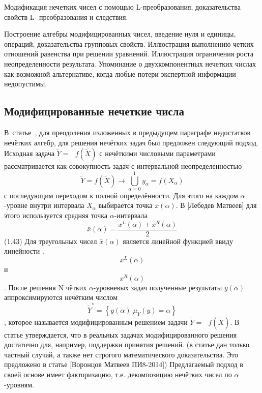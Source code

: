 Модификация нечетких чисел с помощью L-преобразования, доказательства свойств L- преобразования и следствия.

Построение алгебры модифицированных чисел, введение нуля и единицы,  операций, доказательства групповых свойств. Иллюстрация выполнению четких отношений равенства при решении уравнений. Иллюстрация ограничения роста неопределенности результата. Упоминание о двухкомпонентных нечетких числах как возможной альтернативе, когда любые потери экспертной информации недопустимы.

\subsection{Модифицированные нечеткие числа}

В~статье~\cite{Lebedev}, для преодоления изложенных в предыдущем параграфе недостатков нечётких алгебр, для решения нечётких задач был предложен следующий подход. Исходная задача $\tilde{Y}=\text{ }f\left( {\tilde{X}} \right)$ с нечёткими числовыми параметрами рассматривается как совокупность задач с интервальной неопределенностью
\begin{equation}
\label{eq:alpha-equivalence}
	\tilde{Y}=f\left( {\tilde{X}} \right)\to \bigcup\limits_{\alpha =0}^{1}{{{y}_{\alpha }}=f\left( {{X}_{\alpha }} \right)}
\end{equation}
с последующим переходом к полной определённости. Для этого на каждом $\alpha $-уровне внутри интервала $X_\alpha$ выбирается точка $\bar{x}\left( \alpha  \right)$. В [Лебедев Матвеев] для этого используется средняя точка $\alpha $-интервала
	\[\bar{x}\left( \alpha  \right)=\frac{{{x}^{L}}\left( \alpha  \right)+{{x}^{R}}\left( \alpha  \right)}{2}\] 	(1.43)
Для треугольных чисел $\bar{x}\left( \alpha  \right)$ является линейной функцией ввиду линейности .\[{{x}^{L}}\left( \alpha  \right)\] и \[{{x}^{R}}\left( \alpha  \right)\]. После решения N чётких $\alpha $-уровневых задач полученные результаты $y\left( \alpha  \right)$ аппроксимируются нечётким числом \[{{\tilde{Y}}^{*}}=\left\{ y(\alpha )\left| {{\mu }_{{\tilde{Y}}}}(y)=\alpha  \right. \right\}\], которое называется модифицированным решением задачи $\tilde{Y}=\text{ }f\left( {\tilde{X}} \right)$. В статье утверждается, что в реальных задачах модифицированного решения достаточно для, например, поддержки принятия решений. (в статье дан только частный случай, а также нет строгого математического доказательства. Это предложено в статье [Воронцов Матвеев ПИ8-2014]) Предлагаемый подход в своей основе имеет факторизацию, т.е. декомпозицию нечётких чисел по $\alpha $-уровням.
